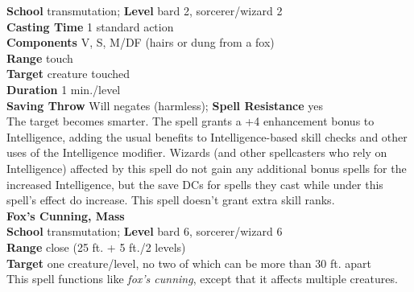 \textbf{School} transmutation; \textbf{Level} bard 2, sorcerer/wizard 2\\
\textbf{Casting Time} 1 standard action\\
\textbf{Components} V, S, M/DF (hairs or dung from a fox)\\
\textbf{Range} touch\\
\textbf{Target} creature touched\\
\textbf{Duration} 1 min./level\\
\textbf{Saving Throw }Will negates (harmless); \textbf{Spell Resistance} yes\\
The target becomes smarter. The spell grants a +4 enhancement bonus to Intelligence, adding the usual benefits to Intelligence-based skill checks and other uses of the Intelligence modifier. Wizards (and other spellcasters who rely on Intelligence) affected by this spell do not gain any additional bonus spells for the increased Intelligence, but the save DCs for spells they cast while under this spell's effect do increase. This spell doesn't grant extra skill ranks.\\
\textbf{Fox's Cunning, Mass}\\
\textbf{School} transmutation; \textbf{Level} bard 6, sorcerer/wizard 6\\
\textbf{Range} close (25 ft. + 5 ft./2 levels)\\
\textbf{Target} one creature/level, no two of which can be more than 30 ft. apart\\
This spell functions like \textit{fox's cunning}, except that it affects multiple creatures.\\
